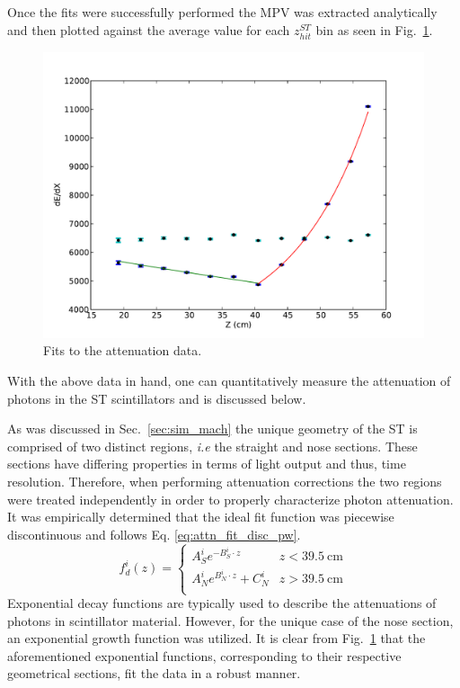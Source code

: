 Once the fits were successfully performed the MPV was extracted analytically and then plotted against the average value for each $z^{ST}_{hit}$ bin as seen in Fig.~\ref{fig:attfits}.
\begin{figure}[!htb]
	\centering
	\includegraphics[width=1.0\columnwidth]{calibration/figs/Att_Fit15}
	\caption{Fits to the attenuation data.}
	\label{fig:attfits}
\end{figure}
With the above data in hand, one can quantitatively measure the attenuation of photons in the ST scintillators and is discussed below.

As was discussed in Sec.~\ref{sec:sim_mach} the unique geometry of the ST is comprised of two distinct regions, \textit{i.e} the straight and nose sections.  These sections have differing properties in terms of light output and thus, time resolution.  Therefore, when performing attenuation corrections the two regions were treated independently in order to properly characterize photon attenuation.  It was empirically determined that the ideal fit function was piecewise discontinuous and follows Eq. \ref{eq:attn_fit_disc_pw}.
	\begin{equation} \label{eq:attn_fit_disc_pw}
	f_{d}^{i}(z) = 
	\begin{cases} 
		A^{i}_{S}e^{-B^{i}_{S} \cdot z} & z < 39.5\ \mathrm{cm} \\
		A^{i}_{N}e^{B^{i}_{N} \cdot z} + C^{i}_{N} & z > 39.5\ \mathrm{cm} \\
	\end{cases}
	\end{equation}
Exponential decay functions are typically used to describe the attenuations of photons in scintillator material.  However, for the unique case of the nose section, an exponential growth function was utilized.  It is clear from Fig.~\ref{fig:attfits} that the aforementioned exponential functions, corresponding to their respective geometrical sections, fit the data in a robust manner.

